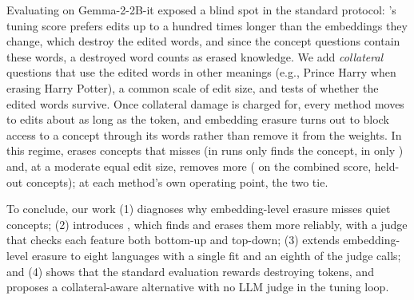 Evaluating \cinder{} on Gemma-2-2B-it \citep{gemma2024gemma2} exposed a blind spot in the standard protocol: \ember{}'s tuning score prefers edits up to a hundred times longer than the embeddings they change, which destroy the edited words, and since the concept questions contain these words, a destroyed word counts as erased knowledge.
We add \emph{collateral} questions that use the edited words in other meanings (e.g., Prince Harry when erasing Harry Potter), a common scale of edit size, and tests of whether the edited words survive.
Once collateral damage is charged for, every method moves to edits about as long as the token, and embedding erasure turns out to block access to a concept through its words rather than remove it from the weights.
In this regime, \cinder{} erases concepts that \ember{} misses (in  runs only \cinder{} finds the concept, in  only \ember{}) and, at a moderate equal edit size, removes more ( on the combined score,  held-out concepts); at each method's own operating point, the two tie.

To conclude, our work (1) diagnoses why embedding-level erasure misses quiet concepts; (2) introduces \cinder{}, which finds and erases them more reliably, with a judge that checks each feature both bottom-up and top-down; (3) extends embedding-level erasure to eight languages with a single fit and an eighth of the judge calls; and (4) shows that the standard evaluation rewards destroying tokens, and proposes a collateral-aware alternative with no LLM judge in the tuning loop.
